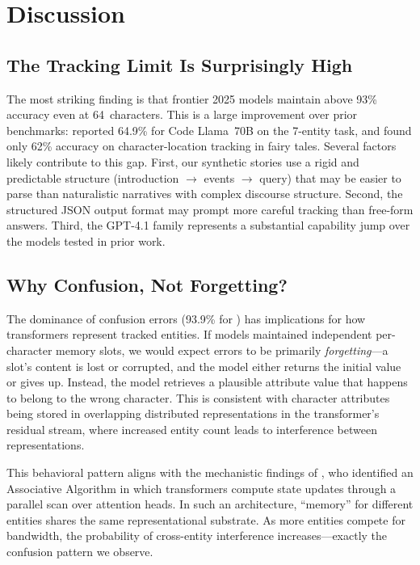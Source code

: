 \section{Discussion}
\label{sec:discussion}

\subsection{The Tracking Limit Is Surprisingly High}

The most striking finding is that frontier 2025 models maintain above 93\% accuracy even at 64~characters.
This is a large improvement over prior benchmarks: \citet{kim2024code} reported 64.9\% for Code Llama~70B on the 7-entity \boxes task, and \citet{locations2025} found only 62\% accuracy on character-location tracking in fairy tales.
Several factors likely contribute to this gap.
First, our synthetic stories use a rigid and predictable structure (introduction $\rightarrow$ events $\rightarrow$ query) that may be easier to parse than naturalistic narratives with complex discourse structure.
Second, the structured JSON output format may prompt more careful tracking than free-form answers.
Third, the GPT-4.1 family represents a substantial capability jump over the models tested in prior work.

\subsection{Why Confusion, Not Forgetting?}

The dominance of confusion errors (93.9\% for \gptmini) has implications for how transformers represent tracked entities.
If models maintained independent per-character memory slots, we would expect errors to be primarily \emph{forgetting}---a slot's content is lost or corrupted, and the model either returns the initial value or gives up.
Instead, the model retrieves a plausible attribute value that happens to belong to the wrong character.
This is consistent with character attributes being stored in overlapping distributed representations in the transformer's residual stream, where increased entity count leads to interference between representations.

This behavioral pattern aligns with the mechanistic findings of \citet{li2025state}, who identified an Associative Algorithm in which transformers compute state updates through a parallel scan over attention heads.
In such an architecture, ``memory'' for different entities shares the same representational substrate.
As more entities compete for bandwidth, the probability of cross-entity interference increases---exactly the confusion pattern we observe.

